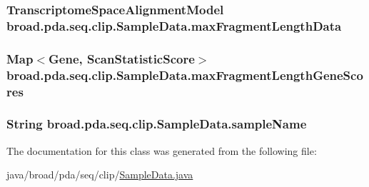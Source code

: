 \hypertarget{classbroad_1_1pda_1_1seq_1_1clip_1_1_sample_data_ae74526f9f7081cb45a51ac714bdb788e}{
\subsubsection[{max\+Fragment\+Length\+Data}]{\setlength{\rightskip}{0pt plus 5cm}Transcriptome\+Space\+Alignment\+Model broad.\+pda.\+seq.\+clip.\+Sample\+Data.\+max\+Fragment\+Length\+Data\hspace{0.3cm}{\ttfamily [protected]}}}\label{classbroad_1_1pda_1_1seq_1_1clip_1_1_sample_data_ae74526f9f7081cb45a51ac714bdb788e}
\hypertarget{classbroad_1_1pda_1_1seq_1_1clip_1_1_sample_data_ab16a8cd9c6087c8086bdc63e4daae69d}{
\subsubsection[{max\+Fragment\+Length\+Gene\+Scores}]{\setlength{\rightskip}{0pt plus 5cm}Map$<$Gene, Scan\+Statistic\+Score$>$ broad.\+pda.\+seq.\+clip.\+Sample\+Data.\+max\+Fragment\+Length\+Gene\+Scores\hspace{0.3cm}{\ttfamily [protected]}}}\label{classbroad_1_1pda_1_1seq_1_1clip_1_1_sample_data_ab16a8cd9c6087c8086bdc63e4daae69d}
\hypertarget{classbroad_1_1pda_1_1seq_1_1clip_1_1_sample_data_a7c4644dba1de73c9baf1743c65628617}{
\subsubsection[{sample\+Name}]{\setlength{\rightskip}{0pt plus 5cm}String broad.\+pda.\+seq.\+clip.\+Sample\+Data.\+sample\+Name\hspace{0.3cm}{\ttfamily [protected]}}}\label{classbroad_1_1pda_1_1seq_1_1clip_1_1_sample_data_a7c4644dba1de73c9baf1743c65628617}


The documentation for this class was generated from the following file\+:\begin{DoxyCompactItemize}
\item 
java/broad/pda/seq/clip/\hyperlink{clip_2_sample_data_8java}{Sample\+Data.\+java}\end{DoxyCompactItemize}
